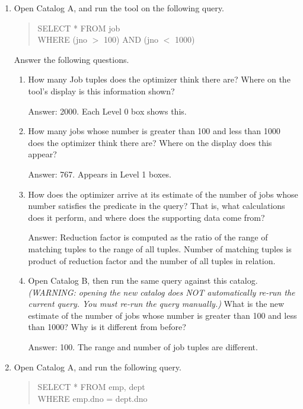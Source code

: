 \begin{enumerate}
\item
Open Catalog A, and run the tool on the following query.
\begin{quote}
        SELECT * FROM job\\
        WHERE (jno $>$ 100) AND (jno $<$ 1000)
\end{quote}

Answer the following questions.
\begin{enumerate}
\item
How many Job tuples does the optimizer think there are?  Where on the
tool's display is this information shown?

Answer: 2000.  Each Level 0 box shows this.

\item
How many jobs whose number is greater than 100 and less than 1000 does
the optimizer think there are?  Where on the display does this appear?

Answer: 767.  Appears in Level 1 boxes.

\item
How does the optimizer arrive at its estimate of the number of jobs whose
number satisfies the predicate in the query?  That is, what calculations
does it perform, and where does the supporting data come from?

Answer: Reduction factor is computed as the ratio of the range of matching
tuples to the range of all tuples.  Number of matching tuples is product
of reduction factor and the number of all tuples in relation.

\item
Open Catalog B, then run the same query against this catalog.  {\em
(WARNING: opening the new catalog does NOT automatically re-run the
current query.  You must re-run the query manually.)}  What is the new
estimate of the number of jobs whose number is greater than 100 and less
than 1000?  Why is it different from before?

Answer: 100.  The range and number of job tuples are different.
\end{enumerate}


\item
Open Catalog A, and run the following query.

\begin{quote}
        SELECT * FROM emp, dept\\
        WHERE emp.dno = dept.dno
\end{quote}


\end{enumerate}
